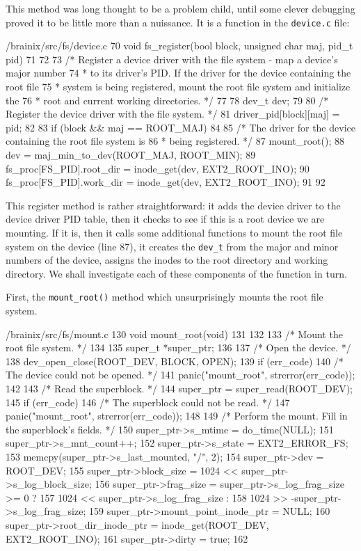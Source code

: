 \documentclass{article}
\begin{document}
This method was long thought to be a problem child, until some clever debugging proved it to be little more than a nuissance. It is a function in the \verb|device.c| file:
\begin{code}{/brainix/src/fs/device.c}
70 void fs_register(bool block, unsigned char maj, pid_t pid)
71 {
72 
73 /* Register a device driver with the file system - map a device's major number
74  * to its driver's PID.  If the driver for the device containing the root file
75  * system is being registered, mount the root file system and initialize the
76  * root and current working directories. */
77
78      dev_t dev;
79 
80      /* Register the device driver with the file system. */
81      driver_pid[block][maj] = pid;
82 
83      if (block && maj == ROOT_MAJ)
84      {
85           /* The driver for the device containing the root file system is
86            * being registered. */
87           mount_root();
88           dev = maj_min_to_dev(ROOT_MAJ, ROOT_MIN);
89           fs_proc[FS_PID].root_dir = inode_get(dev, EXT2_ROOT_INO);
90           fs_proc[FS_PID].work_dir = inode_get(dev, EXT2_ROOT_INO);
91      }
92 }
\end{code}
This register method is rather straightforward: it adds the device driver to the device driver PID table, then it checks to see if this is a root device we are mounting. If it is, then it calls some additional functions to mount the root file system on the device (line 87), it creates the \verb|dev_t| from the major and minor numbers of the device, assigns the inodes to the root directory and working directory. We shall investigate each of these components of the function in turn.

First, the \verb|mount_root()| method which unsurprisingly mounts the root file system.
\begin{code}{/brainix/src/fs/mount.c}
130 void mount_root(void)
131 {
132 
133 /* Mount the root file system. */
134 
135      super_t *super_ptr;
136 
137      /* Open the device. */
138      dev_open_close(ROOT_DEV, BLOCK, OPEN);
139      if (err_code)
140           /* The device could not be opened. */
141           panic("mount_root", strerror(err_code));
142 
143      /* Read the superblock. */
144      super_ptr = super_read(ROOT_DEV);
145      if (err_code)
146           /* The superblock could not be read. */
147           panic("mount_root", strerror(err_code));
148 
149      /* Perform the mount.  Fill in the superblock's fields. */
150      super_ptr->s_mtime = do_time(NULL);
151      super_ptr->s_mnt_count++;
152      super_ptr->s_state = EXT2_ERROR_FS;
153      memcpy(super_ptr->s_last_mounted, "/\0", 2);
154      super_ptr->dev = ROOT_DEV;
155      super_ptr->block_size = 1024 << super_ptr->s_log_block_size;
156      super_ptr->frag_size = super_ptr->s_log_frag_size >= 0 ?
157           1024 << super_ptr->s_log_frag_size :
158           1024 >> -super_ptr->s_log_frag_size;
159      super_ptr->mount_point_inode_ptr = NULL;
160      super_ptr->root_dir_inode_ptr = inode_get(ROOT_DEV, EXT2_ROOT_INO);
161      super_ptr->dirty = true;
162 }
\end{code}
\end{document}
